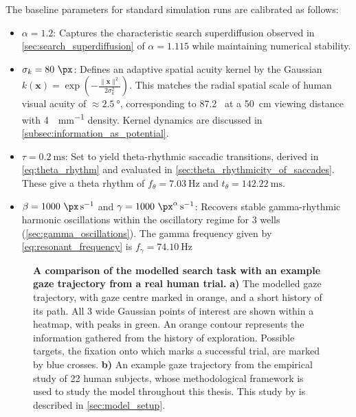 The baseline parameters for standard simulation runs are calibrated as follows:
\begin{itemize}
	\item $\alpha = 1.2$: Captures the characteristic search superdiffusion observed in \cref{sec:search_superdiffusion} of $\alpha = 1.115$ while maintaining numerical stability.
	\item $\sigma_{k} = 80~\unit{\px}$: Defines an adaptive spatial acuity kernel by the Gaussian $k(\mathbf{x}) = \exp \left( -\frac{\|\mathbf{x}\|^2}{2\sigma_{k}^2} \right)$. This matches the radial spatial scale of human visual acuity of $\approx \qty{2.5}{\degree}$, corresponding to 87.2~\unit{\px} at a \qty{50}{\cm} viewing distance with 4~\unit{\px\per\mm} density. Kernel dynamics are discussed in \cref{subsec:information_as_potential}.
	\item $\tau = \qty{0.2}{\milli \second}$: Set to yield theta-rhythmic saccadic transitions, derived in \cref{eq:theta_rhythm} and evaluated in \cref{sec:theta_rhythmicity_of_saccades}. These give a theta rhythm of $f_{\theta} = \qty{7.03}{\hertz}$ and $t_{\theta}=\qty{142.22}{\milli \second}$.
	\item $\beta = 1000~\unit{\px~\second^{-1}}$ and $\gamma = 1000~\unit{\px^{\alpha}~\second^{-1}}$: Recovers stable gamma-rhythmic harmonic oscillations within the oscillatory regime for \qty{3}{\px} wells (\cref{sec:gamma_oscillations}). The gamma frequency given by \cref{eq:resonant_frequency} is $f_{\gamma} = \qty{74.10}{\hertz}$
\end{itemize}

\begin{figure}[htbp]
	\centering
	\begin{subfigure}[T]{0.6\textwidth}
		\centering
	\end{subfigure}
	\hfill
	\begin{subfigure}[T]{0.39\textwidth}
		\centering
	\end{subfigure}
	\caption{\textbf{A comparison of the modelled search task with an example gaze trajectory from a real human trial.} \textbf{a)} The modelled gaze trajectory, with gaze centre marked in orange, and a short history of its path. All \qty{3}{\px} wide Gaussian points of interest are shown within a heatmap, with peaks in green. An orange contour represents the information gathered from the history of exploration. Possible targets, the fixation onto which marks a successful trial, are marked by blue crosses. \textbf{b)} An example gaze trajectory from the empirical study of 22 human subjects, whose methodological framework is used to study the model throughout this thesis. This study by \textcite{naher_primate_saccades} is described in \cref{sec:model_setup}.}
	\label{fig:trajectories}
\end{figure}